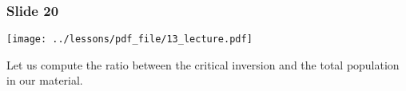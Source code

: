 \documentclass[../main/main.tex]{subfiles}
\begin{document}
\subsubsection*{Slide 20}

\begin{minipage}[]{0.5\linewidth}
\centering
\texttt{[image: ../lessons/pdf\_file/13\_lecture.pdf]}
\end{minipage}
\hspace{0.3cm}\vspace{0.3cm}
\begin{minipage}[c]{0.47\linewidth}

Let us compute the ratio between the critical inversion and the total population in our material.

\end{minipage}
\end{document}
